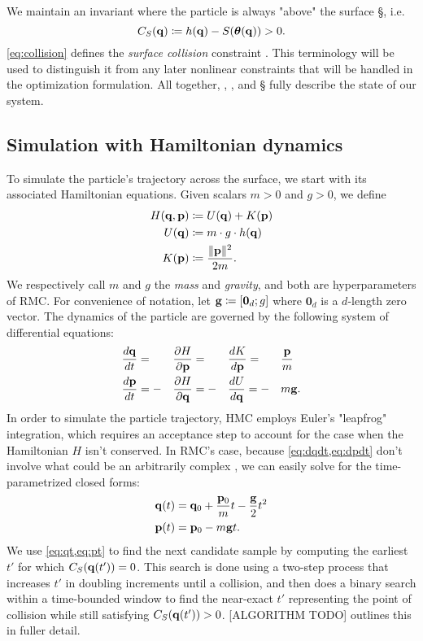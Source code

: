 We maintain an invariant where the particle is always "above" the surface \S,
i.e.
\begin{equation}
    \label{eq:collision}
    C_{S}({\mathbf{q}{}}) \coloneqq h(\mathbf{q}{}) - S(\boldsymbol{\theta}(\mathbf{q}{})) > 0.
\end{equation}
\cref{eq:collision} defines the \emph{surface collision} constraint \CS{}. This
terminology will be used to distinguish it from any later nonlinear constraints
that will be handled in the optimization formulation. All together, \q{}, \p{},
and \S{} fully describe the state of our system.

\subsection{Simulation with Hamiltonian dynamics} \label{ss:hamiltonian}

To simulate the particle's trajectory across the surface, we start with its
associated Hamiltonian equations. Given scalars $m > 0$ and $g > 0$, we define
\begin{align*}
    H(\mathbf{q}{}, \mathbf{p}{}) &\coloneqq U(\mathbf{q}{}) + K(\mathbf{p}{}) \\
    U(\mathbf{q}{}) &\coloneqq m \cdot g \cdot h(\mathbf{q}{}) \\
    K(\mathbf{p}{}) &\coloneqq \frac{\lVert \mathbf{p}{} \rVert^2}{2m}.
\end{align*}
We respectively call $m$ and $g$ the \emph{mass} and \emph{gravity}, and both
are hyperparameters of RMC. For convenience of notation, let $\mathbf{g}{} \coloneqq
[\mathbf{0}_d; g]$ where $\mathbf{0}_d$ is a $d$-length zero vector. The
dynamics of the particle are governed by the following system of differential
equations:
\begin{alignat}{4}
    &\frac{d\mathbf{q}{}}{dt} = &&\frac{\partial H}{\partial \mathbf{p}{}} = &&\frac{dK}{d\mathbf{p}{}} = &&\frac{\mathbf{p}{}}{m} \label{eq:dqdt} \\
    &\frac{d\mathbf{p}{}}{dt} = -&&\frac{\partial H}{\partial \mathbf{q}{}} = -&&\frac{dU}{d\mathbf{q}{}} = -&&m\mathbf{g}{}. \label{eq:dpdt}
\end{alignat}
In order to simulate the particle trajectory, HMC employs Euler's "leapfrog"
integration, which requires an acceptance step to account for the case when the
Hamiltonian $H$ isn't conserved. In RMC's case, because \cref{eq:dqdt,eq:dpdt}
don't involve what could be an arbitrarily complex \surface{}, we can easily
solve for the time-parametrized closed forms:
\begin{align}
    \mathbf{q}(t){} &= \mathbf{q}_{0}{} + \frac{\mathbf{p}_{0}{}}{m}t - \frac{\mathbf{g}{}}{2}t^2 \label{eq:qt} \\
    \mathbf{p}(t){} &= \mathbf{p}_{0}{} - m\mathbf{g}{}t. \label{eq:pt}
\end{align}
We use \cref{eq:qt,eq:pt} to find the next candidate sample \thetai{} by
computing the earliest $t'$ for which $C_{S}({\mathbf{q}(t')}) = 0$. This search is done
using a two-step process that increases $t'$ in doubling increments until a
collision, and then does a binary search within a time-bounded window to find
the near-exact $t'$ representing the point of collision while still satisfying
$C_{S}({\mathbf{q}(t')}) > 0$. [ALGORITHM TODO] outlines this in fuller detail.

